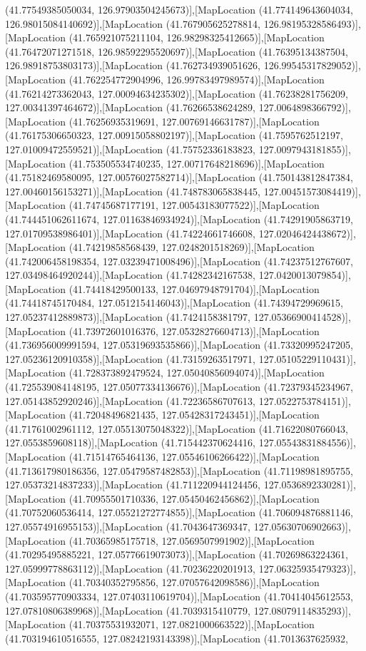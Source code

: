 (41.77549385050034, 126.97903504245673)],[MapLocation (41.774149643604034, 126.98015084140692)],[MapLocation (41.767905625278814, 126.98195328586493)],[MapLocation (41.765921075211104, 126.98298325412665)],[MapLocation (41.76472071271518, 126.98592295520697)],[MapLocation (41.76395134387504, 126.98918753803173)],[MapLocation (41.762734939051626, 126.99545317829052)],[MapLocation (41.762254772904996, 126.99783497989574)],[MapLocation (41.76214273362043, 127.00094634235302)],[MapLocation (41.76238281756209, 127.00341397464672)],[MapLocation (41.76266538624289, 127.0064898366792)],[MapLocation (41.76256935319691, 127.00769146631787)],[MapLocation (41.76175306650323, 127.00915058802197)],[MapLocation (41.7595762512197, 127.01009472559521)],[MapLocation (41.75752336183823, 127.0097943181855)],[MapLocation (41.753505534740235, 127.00717648218696)],[MapLocation (41.75182469580095, 127.00576027582714)],[MapLocation (41.750143812847384, 127.00460156153271)],[MapLocation (41.748783065838445, 127.00451573084419)],[MapLocation (41.74745687177191, 127.00543183077522)],[MapLocation (41.744451062611674, 127.01163846934924)],[MapLocation (41.74291905863719, 127.01709538986401)],[MapLocation (41.74224661746608, 127.02046424438672)],[MapLocation (41.74219858568439, 127.0248201518269)],[MapLocation (41.742006458198354, 127.03239471008496)],[MapLocation (41.74237512767607, 127.03498464920244)],[MapLocation (41.74282342167538, 127.0420013079854)],[MapLocation (41.74418429500133, 127.04697948791704)],[MapLocation (41.74418745170484, 127.0512154146043)],[MapLocation (41.74394729969615, 127.05237412889873)],[MapLocation (41.7424158381797, 127.05366900414528)],[MapLocation (41.73972601016376, 127.05328276604713)],[MapLocation (41.736956009991594, 127.05319693535866)],[MapLocation (41.73320995247205, 127.05236120910358)],[MapLocation (41.73159263517971, 127.05105229110431)],[MapLocation (41.728373892479524, 127.05040856094074)],[MapLocation (41.725539084148195, 127.05077334136676)],[MapLocation (41.72379345234967, 127.05143852920246)],[MapLocation (41.72236586707613, 127.0522753784151)],[MapLocation (41.72048496821435, 127.05428317243451)],[MapLocation (41.71761002961112, 127.05513075048322)],[MapLocation (41.71622080766043, 127.0553859608118)],[MapLocation (41.715442370624416, 127.05543831884556)],[MapLocation (41.71514765464136, 127.05546106266422)],[MapLocation (41.713617980186356, 127.05479587482853)],[MapLocation (41.71198981895755, 127.05373214837233)],[MapLocation (41.711220944124456, 127.0536892330281)],[MapLocation (41.70955501710336, 127.05450462456862)],[MapLocation (41.70752060536414, 127.05521272774855)],[MapLocation (41.706094876881146, 127.05574916955153)],[MapLocation (41.7043647369347, 127.05630706902663)],[MapLocation (41.70365985175718, 127.0569507991902)],[MapLocation (41.70295495885221, 127.05776619073073)],[MapLocation (41.70269863224361, 127.05999778863112)],[MapLocation (41.70236220201913, 127.06325935479323)],[MapLocation (41.70340352795856, 127.07057642098586)],[MapLocation (41.703595770903334, 127.07403110619704)],[MapLocation (41.70414045612553, 127.07810806389968)],[MapLocation (41.7039315410779, 127.08079114835293)],[MapLocation (41.70375531932071, 127.0821000663522)],[MapLocation (41.703194610516555, 127.08242193143398)],[MapLocation (41.7013637625932, 